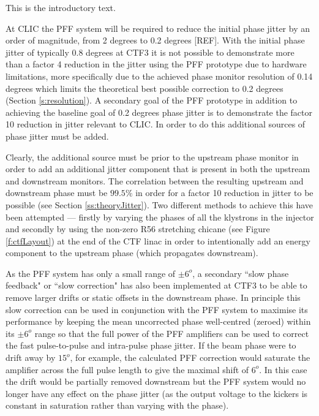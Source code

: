 
This is the introductory text.


At CLIC the PFF system will be required to reduce the initial phase jitter by an order of magnitude, from 2 degrees to 0.2 degrees [REF]. With the initial phase jitter of typically 0.8 degrees at CTF3 it is not possible to demonstrate more than a factor 4 reduction in the jitter using the PFF prototype due to hardware limitations, more specifically due to the achieved phase monitor resolution of 0.14 degrees which limits the theoretical best possible correction to 0.2 degrees (Section \ref{s:resolution}). A secondary goal of the PFF prototype in addition to achieving the baseline goal of 0.2 degrees phase jitter is to demonstrate the factor 10 reduction in jitter relevant to CLIC. In order to do this additional sources of phase jitter must be added.

Clearly, the additional source must be prior to the upstream phase monitor in order to add an additional jitter component that is present in both the upstream and downstream monitors. The correlation between the resulting upstream and downstream phase must be  \(99.5\%\) in order for a factor 10 reduction in jitter to be possible (see Section \ref{ss:theoryJitter}). Two different methods to achieve this have been attempted --- firstly by varying the phases of all the klystrons in the injector and secondly by using the non-zero R56 stretching chicane (see Figure \ref{f:ctfLayout}) at the end of the CTF linac in order to intentionally add an energy component to the upstream phase (which propagates downstream).


As the PFF system has only a small range of \(\pm6^{o}\), a secondary ``slow phase feedback" or ``slow correction" has also been implemented at CTF3 to be able to remove larger drifts or static offsets in the downstream phase. In principle this slow correction can be used in conjunction with the PFF system to maximise its performance by keeping the mean uncorrected phase well-centred (zeroed) within its \(\pm6^{o}\) range so that the full power of the PFF amplifiers can be used to correct the fast pulse-to-pulse and intra-pulse phase jitter. If the beam phase were to drift away by \(15^{o}\), for example, the calculated PFF correction would saturate the amplifier across the full pulse length to give the maximal shift of \(6^{o}\). In this case the drift would be partially removed downstream but the PFF system would no longer have any effect on the phase jitter (as the output voltage to the kickers is constant in saturation rather than varying with the phase).

